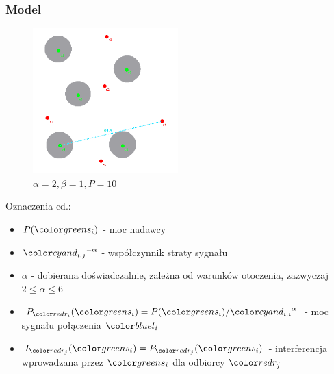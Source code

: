 \documentclass[polish, t,10pt]{beamer}
\begin{document}
    \begin{frame}
        \frametitle{Model}
        \begin{figure}
            \includegraphics[width=0.5\textwidth]{pictures/model-diagram1.png}
            \caption{$\alpha=2, \beta=1, P=10$}
        \end{figure}
        Oznaczenia cd.:
        \begin{itemize}
            \item $P(\si)$ - moc nadawcy
            \item $\dij^{-\alpha}$ - współczynnik straty sygnału
            \item $\alpha$ - dobierana doświadczalnie, zależna od warunków otoczenia, zazwyczaj $2 \le \alpha \leq 6$
            \item $P_{\ri}(\si) = P(\si) / \dii^\alpha$ - moc sygnału połączenia $\li$
            \item $I_{\rj}(\si) = P_{\rj}(\si)$ - interferencja wprowadzana przez $\si$ dla odbiorcy $\rj$
        \end{itemize}
    \end{frame}
\end{document}
